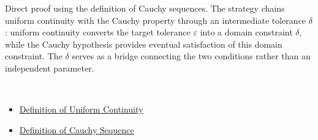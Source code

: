\begin{remark*}
Direct proof using the definition of Cauchy sequences. The strategy chains uniform continuity with the Cauchy property through an intermediate tolerance $\delta$: uniform continuity converts the target tolerance $\varepsilon$ into a domain constraint $\delta$, while the Cauchy hypothesis provides eventual satisfaction of this domain constraint. The $\delta$ serves as a bridge connecting the two conditions rather than an independent parameter.
\end{remark*}

\begin{remark*}[Dependencies]~\\
\begin{itemize}
  \item \hyperref[def:uniform-continuity]{Definition of Uniform Continuity}
  \item \hyperref[def:cauchy-sequence]{Definition of Cauchy Sequence}
\end{itemize}
\end{remark*}

\clearpage
